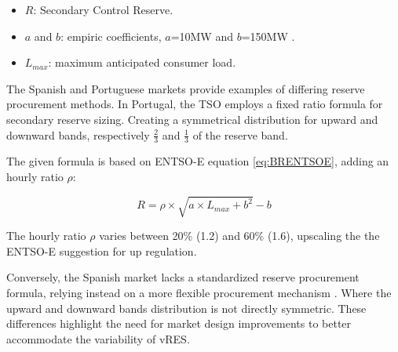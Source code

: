 \begin{itemize}
  \item $R$: Secondary Control Reserve.
  \item $a$ and $b$: empiric coefficients, $a$=10MW and $b$=150MW .
  \item $L_{max}$: maximum anticipated consumer load.
\end{itemize}

The Spanish and Portuguese markets provide examples of differing reserve procurement methods. In Portugal, the \gls{TSO} employs a fixed ratio formula for secondary reserve sizing. Creating a symmetrical distribution for upward and downward bands, respectively $\frac{2}{3}$ and $\frac{1}{3}$ of the reserve band.\par
The given formula is based on \gls{ENTSO-E} equation \eqref{eq:BRENTSOE}, adding an hourly ratio $\rho$:

\begin{linenomath}
  \begin{equation}\label{eq:BRREN} 
    R = \rho \times \sqrt{a \times  L_{max} + b^{2}} - b 
  \end{equation}
  \end{linenomath}

The hourly ratio $\rho$ varies between 20\% (1.2) and 60\% (1.6), upscaling the the ENTSO-E suggestion for up regulation.

Conversely, the Spanish market lacks a standardized reserve procurement formula, relying instead on a more flexible procurement mechanism \cite{Frade2019_market}. Where the upward and downward bands distribution is not directly symmetric.
These differences highlight the need for market design improvements to better accommodate the variability of \gls{vRES}.



